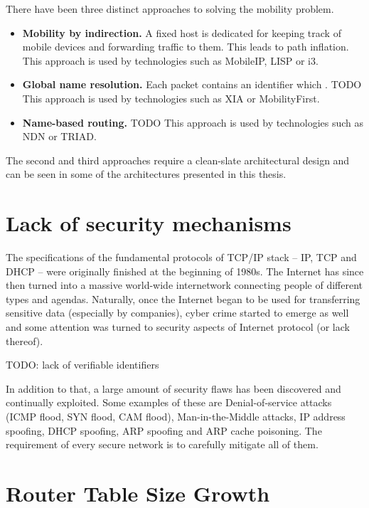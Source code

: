         There have been three distinct approaches to solving the mobility problem.

        \begin{itemize}
            \item \textbf{Mobility by indirection.} A fixed host is dedicated for keeping track of mobile devices and forwarding traffic to them. This leads to path inflation.
            This approach is used by technologies such as MobileIP, LISP or i3.
            \item \textbf{Global name resolution.} Each packet contains an identifier which . TODO
            This approach is used by technologies such as XIA or MobilityFirst.
            \item \textbf{Name-based routing.} TODO
            This approach is used by technologies such as NDN or TRIAD.
        \end{itemize}

        The second and third approaches require a clean-slate architectural design and can be seen in some of the architectures presented in this thesis.

    \section{Lack of security mechanisms}

        The specifications of the fundamental protocols of TCP/IP stack -- IP, TCP and DHCP -- were originally finished at the beginning of 1980s. The Internet has since then turned into a massive world-wide internetwork connecting people of different types and agendas. Naturally, once the Internet began to be used for transferring sensitive data (especially by companies), cyber crime started to emerge as well and some attention was turned to security aspects of Internet protocol (or lack thereof).

        TODO: lack of verifiable identifiers

        In addition to that, a large amount of security flaws has been discovered and continually exploited. Some examples of these are Denial-of-service attacks (ICMP flood, SYN flood, CAM flood), Man-in-the-Middle attacks, IP address spoofing, DHCP spoofing, ARP spoofing and ARP cache poisoning. The requirement of every secure network is to carefully mitigate all of them.

    \section{Router Table Size Growth}

